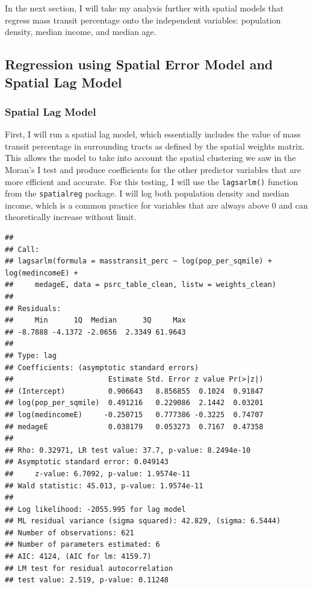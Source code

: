 \documentclass[
]{article}
\begin{document}
In the next section, I will take my analysis further with spatial models
that regress mass transit percentage onto the independent variables:
population density, median income, and median age.

\subsection{Regression using Spatial Error Model and Spatial Lag
Model}\label{regression-using-spatial-error-model-and-spatial-lag-model}

\subsubsection{Spatial Lag Model}\label{spatial-lag-model}

First, I will run a spatial lag model, which essentially includes the
value of mass transit percentage in surrounding tracts as defined by the
spatial weights matrix. This allows the model to take into account the
spatial clustering we saw in the Moran's I test and produce coefficients
for the other predictor variables that are more efficient and accurate.
For this testing, I will use the \texttt{lagsarlm()} function from the
\texttt{spatialreg} package. I will log both population density and
median income, which is a common practice for variables that are always
above 0 and can theoretically increase without limit.

\begin{verbatim}
## 
## Call:
## lagsarlm(formula = masstransit_perc ~ log(pop_per_sqmile) + log(medincomeE) + 
##     medageE, data = psrc_table_clean, listw = weights_clean)
## 
## Residuals:
##     Min      1Q  Median      3Q     Max 
## -8.7888 -4.1372 -2.0656  2.3349 61.9643 
## 
## Type: lag 
## Coefficients: (asymptotic standard errors) 
##                      Estimate Std. Error z value Pr(>|z|)
## (Intercept)          0.906643   8.856855  0.1024  0.91847
## log(pop_per_sqmile)  0.491216   0.229086  2.1442  0.03201
## log(medincomeE)     -0.250715   0.777386 -0.3225  0.74707
## medageE              0.038179   0.053273  0.7167  0.47358
## 
## Rho: 0.32971, LR test value: 37.7, p-value: 8.2494e-10
## Asymptotic standard error: 0.049143
##     z-value: 6.7092, p-value: 1.9574e-11
## Wald statistic: 45.013, p-value: 1.9574e-11
## 
## Log likelihood: -2055.995 for lag model
## ML residual variance (sigma squared): 42.829, (sigma: 6.5444)
## Number of observations: 621 
## Number of parameters estimated: 6 
## AIC: 4124, (AIC for lm: 4159.7)
## LM test for residual autocorrelation
## test value: 2.519, p-value: 0.11248
\end{verbatim}
\end{document}
